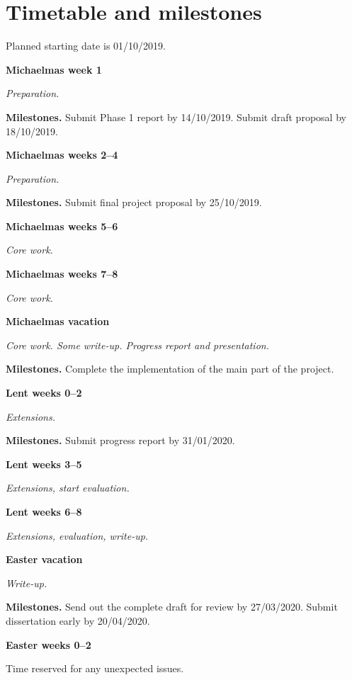 \documentclass[12pt,a4paper,twoside]{article}
\begin{document}
\section*{Timetable and milestones}
\label{section:timetable}


Planned starting date is 01/10/2019.


\textbf{Michaelmas week 1}

\textit{Preparation.}


\textbf{Milestones.} Submit Phase 1 report by 14/10/2019. Submit draft proposal by 18/10/2019.

\textbf{Michaelmas weeks 2–4}

\textit{Preparation.}

\textbf{Milestones.} Submit final project proposal by 25/10/2019.

\textbf{Michaelmas weeks 5–6}

\textit{Core work.}

\textbf{Michaelmas weeks 7–8}

\textit{Core work.}

\textbf{Michaelmas vacation}

\textit{Core work. Some write-up. Progress report and presentation.}

\textbf{Milestones.} Complete the implementation of the main part of the project.

\textbf{Lent weeks 0–2}

\textit{Extensions.}
 
\textbf{Milestones.} Submit progress report by 31/01/2020.


\textbf{Lent weeks 3–5} 

\textit{Extensions, start evaluation.}

\textbf{Lent weeks 6–8}

\textit{Extensions, evaluation, write-up.}

\textbf{Easter vacation}

\textit{Write-up.}

\textbf{Milestones.} Send out the complete draft for review by 27/03/2020. Submit dissertation early by 20/04/2020.

\textbf{Easter weeks 0–2}

 Time reserved for any unexpected issues.



\end{document}
